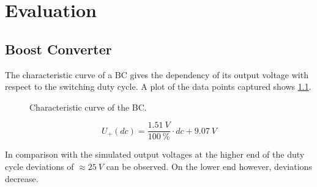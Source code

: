 \chapter{Evaluation}
%
\section{Boost Converter}
    The characteristic curve of a BC gives the dependency of its output voltage with respect to the switching duty cycle.
    A plot of the data points captured shows \cref{fig:characteristic-curve-of-the-boost-converter}.\par
    \begin{figure}[h]
        \centering
        
        \caption[Characteristic curve of the BC]{Characteristic curve of the BC.}
        \label{fig:characteristic-curve-of-the-boost-converter}
    \end{figure}
    \begin{equation}
        U_{+}(dc)=\frac{\SI{1.51}{V}}{\SI{100}{\percent}} \cdot dc + \SI{9.07}{V}
    \end{equation}\par
    In comparison with the simulated output voltages at the higher end of the duty cycle deviations of \( \approx \SI{25}{V} \) can be observed.
    On the lower end however, deviations decrease.
